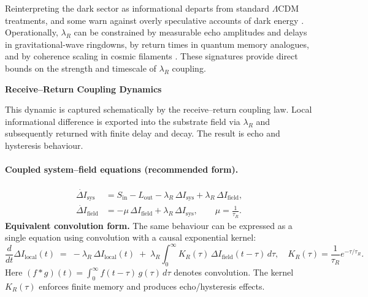 Reinterpreting the dark sector as informational departs from standard $\Lambda$CDM treatments, and some warn against overly speculative accounts of dark energy \cite{Ellis2006}. Operationally, $\lambda_R$ can be constrained by measurable echo amplitudes and delays in gravitational-wave ringdowns, by return times in quantum memory analogues, and by coherence scaling in cosmic filaments \cite{Zhao2024}. These signatures provide direct bounds on the strength and timescale of $\lambda_R$ coupling.
\newline

\noindent \textbf {Receive–Return Coupling Dynamics}

\noindent This dynamic is captured schematically by the receive–return coupling law. Local informational difference is exported into the substrate field via $\lambda_R$ and subsequently returned with finite delay and decay. The result is echo and hysteresis behaviour.

\paragraph{Coupled system–field equations (recommended form).}
\begin{subequations}
\label{eq:66}
\begin{align}
\dot{\Delta I}_{\text{sys}} &= S_{\text{in}} - L_{\text{out}} - \lambda_R \,\Delta I_{\text{sys}} + \lambda_R \,\Delta I_{\text{field}}, \tag{1.6a}\\
\dot{\Delta I}_{\text{field}} &= -\mu\,\Delta I_{\text{field}} + \lambda_R \,\Delta I_{\text{sys}}, \qquad \mu=\frac{1}{\tau_R}. \tag{1.6b}
\end{align}
\end{subequations}
\noindent \textbf {Equivalent convolution form.}
\newline
The same behaviour can be expressed as a single equation using convolution with a causal exponential kernel:
\begin{equation}
\label{eq:67}
\frac{d}{dt}\Delta I_{\text{local}}(t) \;=\; -\lambda_R \,\Delta I_{\text{local}}(t)
 \;+\; \lambda_R \int_{0}^{\infty} \!K_R(\tau)\, \Delta I_{\text{field}}(t-\tau)\, d\tau,\quad 
 K_R(\tau)=\frac{1}{\tau_R}e^{-\tau/\tau_R}.
\end{equation}
Here $(f*g)(t)=\int_{0}^{\infty} f(t-\tau)\,g(\tau)\,d\tau$ denotes convolution.
The kernel $K_R(\tau)$ enforces finite memory and produces echo/hysteresis effects.
\newline

